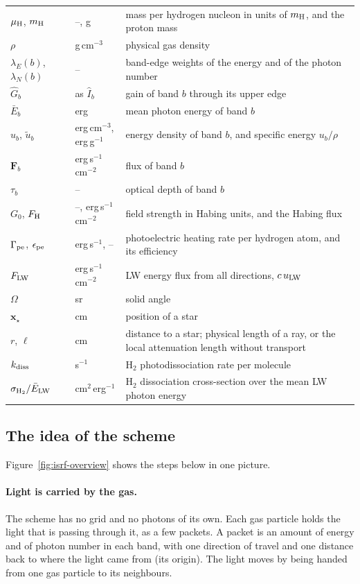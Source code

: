 {\begin{longtable}{>{\raggedright\arraybackslash}p{2.4cm}>{\raggedright\arraybackslash}p{4.4cm}>{\raggedright\arraybackslash}p{7.4cm}}
$\mu_{\rm H}$, $m_{\rm H}$ & --, g & mass per hydrogen nucleon in units of $m_{\rm H}$, and the proton mass \\
$\rho$ & g\,cm$^{-3}$ & physical gas density \\
$\lambda_E(b)$, $\lambda_N(b)$ & -- & band-edge weights of the energy and of the photon number \\
$\hat G_b$ & as $\hat I_b$ & gain of band $b$ through its upper edge \\
$\bar E_b$ & erg & mean photon energy of band $b$ \\
$u_b$, $\tilde u_b$ & erg\,cm$^{-3}$, erg\,g$^{-1}$ & energy density of band $b$, and specific energy $u_b/\rho$ \\
$\boldsymbol{F}_b$ & erg\,s$^{-1}$\,cm$^{-2}$ & flux of band $b$ \\
$\tau_b$ & -- & optical depth of band $b$ \\
$G_0$, $F_{\rm H}$ & --, erg\,s$^{-1}$\,cm$^{-2}$ & field strength in Habing units, and the Habing flux \\
$\Gamma_{\rm pe}$, $\epsilon_{\rm pe}$ & erg\,s$^{-1}$, -- & photoelectric heating rate per hydrogen atom, and its efficiency \\
$F_{\rm LW}$ & erg\,s$^{-1}$\,cm$^{-2}$ & LW energy flux from all directions, $c\,u_{\rm LW}$ \\
$\Omega$ & sr & solid angle \\
$\boldsymbol{x}_\star$ & cm & position of a star \\
$r$, $\ell$ & cm & distance to a star; physical length of a ray, or the local attenuation length without transport \\
$k_{\rm diss}$ & s$^{-1}$ & H$_2$ photodissociation rate per molecule \\
$\sigma_{\rm H_2}/\bar E_{\rm LW}$ & cm$^2$\,erg$^{-1}$ & H$_2$ dissociation cross-section over the mean LW photon energy \\
\bottomrule
\end{longtable}
}

\subsection{The idea of the scheme}
\label{sec:isrf-idea}

Figure~\ref{fig:isrf-overview} shows the steps below in one picture.

\paragraph{Light is carried by the gas.} The scheme has no grid and no
photons of its own. Each gas particle holds the light that is passing through
it, as a few packets. A packet is an amount of energy and of photon number in
each band, with one direction of travel and one distance back to where the
light came from (its origin). The light moves by being handed from one gas
particle to its neighbours.

